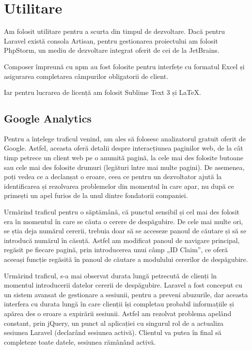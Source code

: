 \section{Utilitare}


	Am folosit utilitare pentru a scurta din timpul de dezvoltare.
	Dacă pentru Laravel există consola Artisan, pentru gestionarea proiectului am folosit PhpStorm, un mediu de dezvoltare integrat oferit de cei de la JetBrains.

	Composer împreună cu npm au fost folosite pentru interfețe cu formatul Excel și asigurarea completarea câmpurilor obligatorii de client.

	Iar pentru lucrarea de licență am folosit Sublime Text 3 și \LaTeX .

	\subsection{Google Analytics}

		Pentru a înțelege traficul venind, am ales să folosesc analizatorul gratuit oferit de Google.
		Astfel, aceasta oferă detalii despre interacțiunea paginilor web, de la cât timp petrece un client web pe o anumită pagină, la cele mai des folosite butoane sau cele mai des folosite drumuri (legături între mai multe pagini). \cite{google_analytics}
		De asemenea, poți vedea ce a declanșat o eroare, ceea ce pentru un dezvoltator ajută la identificarea și rezolvarea problemelor din momentul în care apar, nu după ce primești un apel furios de la unul dintre fondatorii companiei.

		Urmărind traficul pentru o săptămână, că punctul sensibil și cel mai des folosit era în momentul în care se căuta o cerere de despăgubire.
		De cele mai multe ori, se știa deja numărul cererii, trebuia doar să se acceseze panoul de căutare și să se introducă numărul în căsuță.
		Astfel am modificat panoul de navigare principal, regăsit pe fiecare pagină, prin introducerea unui câmp „ID Claim”, ce oferă  aceeași funcție regăsită în panoul de căutare a modulului cererilor de despăgubire.

		Urmărind traficul, s-a mai observat durata lungă petrecută de clienți în momentul introducerii datelor cererii de despăgubire.
		Laravel a fost conceput cu un sistem avansat de gestionare a sesiunii, pentru a preveni abuzurile, dar aceasta interfera cu durata lungă în care clienții își completau probabil informațiile și apărea des o eroare a expirării sesiunii.
		Astfel am rezolvat problema apelând constant, prin jQuery, un punct al aplicației cu singurul rol de a actualiza sesiunea Laravel (declarând sesiunea activă).
		Clientul va putea în final să completeze toate datele, sesiunea rămânând activă.

